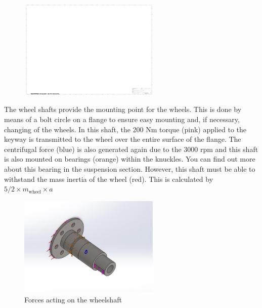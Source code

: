 \begin{figure}[ht]
\centering
\includegraphics[width=0.6\textwidth]{texfiles/mech/eimg/propulsion/spaceholder_technical_drawing}
\caption{}
\label{}
\end{figure}

The wheel shafts provide the mounting point for the wheels. This is done by means of a bolt circle on a flange to ensure easy mounting and, if necessary, changing of the wheels. In this shaft, the 200 Nm torque (pink) applied to the keyway is transmitted to the wheel over the entire surface of the flange. The centrifugal force (blue) is also generated again due to the 3000 rpm and this shaft is also mounted on bearings (orange) within the knuckles. You can find out more about this bearing in the suspension section. However, this shaft must be able to withstand the mass inertia of the wheel (red). This is calculated by
\(5/2 \times m_{\text{wheel}} \times a\)

\begin{figure}[ht]
\centering
\includegraphics[width=0.6\textwidth]{texfiles/mech/eimg/propulsion/picture_forces_wheelshaft}
\caption{Forces acting on the wheelshaft}
\label{fig:wheelshaft_forces}
\end{figure}

